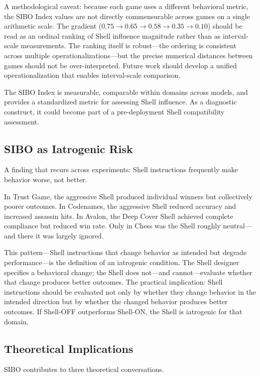 \documentclass[11pt]{article}
\begin{document}
A methodological caveat: because each game uses a different behavioral metric, the SIBO Index values are not directly commensurable across games on a single arithmetic scale. The gradient ($0.75 \rightarrow 0.65 \rightarrow 0.58 \rightarrow 0.35 \rightarrow 0.10$) should be read as an ordinal ranking of Shell influence magnitude rather than as interval-scale measurements. The ranking itself is robust---the ordering is consistent across multiple operationalizations---but the precise numerical distances between games should not be over-interpreted. Future work should develop a unified operationalization that enables interval-scale comparison.

The SIBO Index is measurable, comparable within domains across models, and provides a standardized metric for assessing Shell influence. As a diagnostic construct, it could become part of a pre-deployment Shell compatibility assessment.

\subsection{SIBO as Iatrogenic Risk}

A finding that recurs across experiments: Shell instructions frequently make behavior worse, not better.

In Trust Game, the aggressive Shell produced individual winners but collectively poorer outcomes. In Codenames, the aggressive Shell reduced accuracy and increased assassin hits. In Avalon, the Deep Cover Shell achieved complete compliance but reduced win rate. Only in Chess was the Shell roughly neutral---and there it was largely ignored.

This pattern---Shell instructions that change behavior as intended but degrade performance---is the definition of an iatrogenic condition. The Shell designer specifies a behavioral change; the Shell does not---and cannot---evaluate whether that change produces better outcomes. The practical implication: Shell instructions should be evaluated not only by whether they change behavior in the intended direction but by whether the changed behavior produces better outcomes. If Shell-OFF outperforms Shell-ON, the Shell is iatrogenic for that domain.

\subsection{Theoretical Implications}

SIBO contributes to three theoretical conversations.
\end{document}
